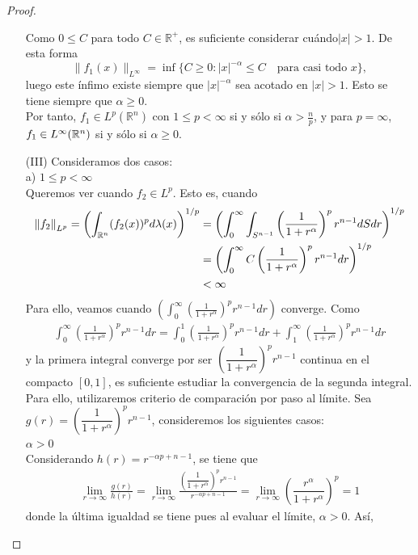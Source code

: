 \begin{proof}
\begin{enumerate}
Como $0 \leq C$ para todo $ C \in \mathbb{R}^+$, es suficiente considerar
cuándo$|x| > 1$. De esta forma
\[\|f_1(x)\|_{L^\infty} = \inf \{ C \geq 0 : |x|^{-\alpha} \leq C \quad \text{para casi todo } x \},\]
luego este ínfimo existe siempre que
$|x|^{-\alpha}$ sea acotado en $|x| > 1$.
Esto se tiene siempre que $\alpha \geq 0$. \\
Por tanto, $f_1 \in L^p(\mathbb{R}^n)$ con $1 \leq p < \infty$ si y sólo si $\alpha> \frac{n}{p}$, y para $p=\infty$, $f_1 \in L^{\infty}(\mathbb{R}^n)$ si y sólo si $\alpha \geq 0$.\\
\item[(III)] Consideramos dos casos: \\
a) $1 \leq p < \infty$ \\
Queremos ver cuando $f_2 \in L^p$. Esto es, cuando
\begin{align*}
\left\|f_2\right\|_{L^p}=\left( \int_{\mathbb{R}^n} (f_2(x))^p d\lambda(x) \right)^{1/p}&= \left( \int_0^{\infty} \int_{S^{n-1}} \left(\frac{1}{1+r^\alpha}\right)^p r^{n-1} dS dr \right)^{1/p}\\&= \left( \int_0^{\infty} C \left(\frac{1}{1+r^\alpha}\right)^p r^{n-1} dr \right)^{1/p}\\&< \infty 
\end{align*}
Para ello, veamos cuando $\displaystyle \left( \int_0^{\infty}  \left(\frac{1}{1+r^\alpha}\right)^p r^{n-1} dr \right)$ converge. Como
\begin{align*}
\int_0^{\infty}  \left(\frac{1}{1+r^\alpha}\right)^p r^{n-1} dr=\int_0^{1}  \left(\frac{1}{1+r^\alpha}\right)^p r^{n-1} dr+\int_1^{\infty}  \left(\frac{1}{1+r^\alpha}\right)^p r^{n-1} dr      
\end{align*}
y la primera integral converge por ser $\left(\dfrac{1}{1+r^\alpha}\right)^pr^{n-1}$ continua en el compacto $[0,1]$, es suficiente estudiar la convergencia de la segunda integral. Para ello, utilizaremos criterio de comparación por paso al límite. Sea $g(r)=\left(\dfrac{1}{1+r^\alpha}\right)^pr^{n-1}$, consideremos los siguientes casos: \\
\checkmark $\alpha>0$ \\
 Considerando $h(r)=r^{-\alpha p+n-1}$, se tiene que
 \begin{align*}
     \lim_{r\to\infty}\frac{g(r)}{h(r)}=\lim_{r\to\infty}\frac{\left(\dfrac{1}{1+r^\alpha}\right)^pr^{n-1}}{r^{-\alpha p+n-1}}=\lim_{r\to\infty}\left(\dfrac{r^{\alpha}}{1+r^\alpha}\right)^p=1
 \end{align*}
 donde la última igualdad se tiene pues al evaluar el límite, $\alpha>0$. Así, 

\end{enumerate}
\end{proof}
